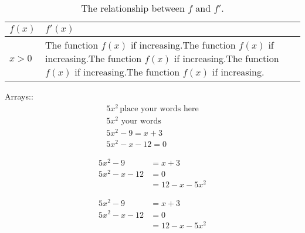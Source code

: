 \documentclass[11pt]{article}
\begin{document}
\begin{table}[H]
\centering
\def \arraystretch{1.5}
\caption{The relationship between $f$ and $f'$.}
\begin{tabular}{|l|p{4in}|}
\hline
$f(x)$ & $f'(x)$ \\ \hline
$x>0$ & The function $f(x)$ if increasing.The function $f(x)$ if increasing.The function $f(x)$ if increasing.The function $f(x)$ if increasing.The function $f(x)$ if increasing. \\ \hline
\end{tabular}
\end{table}



Arrays::
\begin{align}
5x^2\,\text{place your words here} \\
5x^2\text{ your words}\\
5x^2-9=x+3\\
5x^2-x-12=0
\end{align}

\begin{align*}
5x^2-9&=x+3\\
5x^2-x-12&=0\\
&=12-x-5x^2
\end{align*}

\begin{align}
5x^2-9&=x+3\\
5x^2-x-12&=0\\
&=12-x-5x^2
\end{align}
\end{document}
